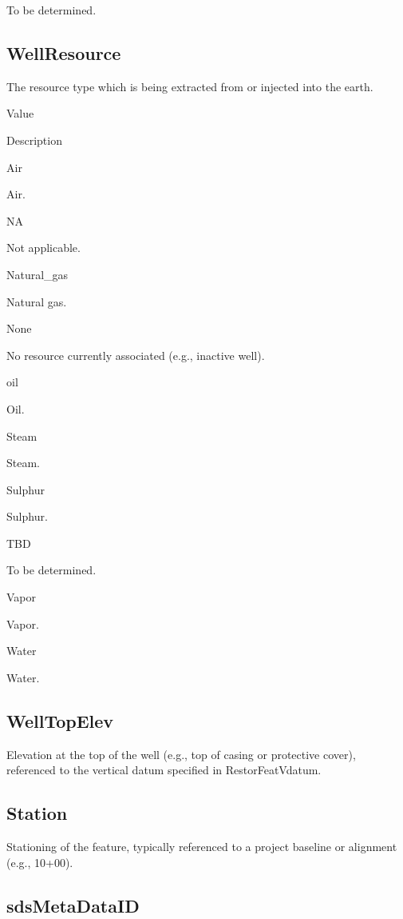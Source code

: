 \documentclass[
  letterpaper,
  DIV=11,
  numbers=noendperiod]{scrreprt}
\begin{document}
To be determined.

\subsection{WellResource}\label{wellresource}

The resource type which is being extracted from or injected into the
earth.

Value

Description

Air

Air.

NA

Not applicable.

Natural\_gas

Natural gas.

None

No resource currently associated (e.g., inactive well).

oil

Oil.

Steam

Steam.

Sulphur

Sulphur.

TBD

To be determined.

Vapor

Vapor.

Water

Water.

\subsection{WellTopElev}\label{welltopelev}

Elevation at the top of the well (e.g., top of casing or protective
cover), referenced to the vertical datum specified in RestorFeatVdatum.

\subsection{Station}\label{station-4}

Stationing of the feature, typically referenced to a project baseline or
alignment (e.g., 10+00).

\subsection{sdsMetaDataID}\label{sdsmetadataid-15}
\end{document}
